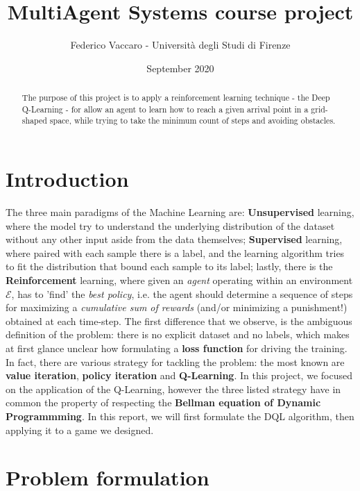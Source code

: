 \documentclass{article}
\title{MultiAgent Systems course project}
\author{Federico Vaccaro - Università degli Studi di Firenze }
\date{September 2020}
\begin{document}
\maketitle

\begin{abstract}
	The purpose of this project is to apply a reinforcement learning technique - the Deep Q-Learning - for allow an agent to learn how to reach a given arrival point in a grid-shaped space, while trying to take the minimum count of steps and avoiding obstacles.
\end{abstract}


\section{Introduction}

The three main paradigms of the Machine Learning are: \textbf{Unsupervised} learning, where the model try to understand the underlying distribution of the dataset without any other input aside from the data themselves; \textbf{Supervised} learning, where paired with each sample there is a label, and the learning algorithm tries to fit the distribution that bound each sample to its label; lastly, there is the \textbf{Reinforcement} learning, where given an \textit{agent} operating within an environment $\mathcal{E}
$, has to 'find' the \textit{best policy}, i.e. the agent should determine a sequence of steps for maximizing a \textit{cumulative sum of rewards} (and/or minimizing a punishment!) obtained at each time-step. The first difference that we observe, is the ambiguous definition of the problem: there is no explicit dataset and no labels, which makes at first glance unclear how formulating a \textbf{loss function} for driving the training. In fact, there are various strategy for tackling the problem: the most known are \textbf{value iteration}, \textbf{policy iteration} and \textbf{Q-Learning}. In this project, we focused on the application of the Q-Learning, however the three listed strategy have in common the property of respecting the \textbf{Bellman equation of Dynamic Programmming}. In this report, we will first formulate the DQL algorithm, then applying it to a game we designed.

\section{Problem formulation}
\end{document}
